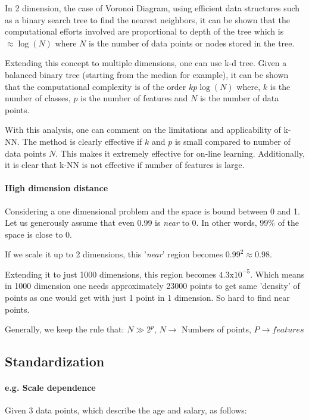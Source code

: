 \documentclass{article}
\begin{document}
{{{            In 2 dimension, the case of Voronoi Diagram, using efficient data structures such as a binary search tree to find the nearest neighbors, it can be shown that the computational efforts involved are proportional to depth of the tree which is \(\approx \log(N)\) where $N$ is the number of data points or nodes stored in the tree. 

            Extending this concept to multiple dimensions, one can use k-d tree. Given a balanced binary tree (starting from the median for example), it can be shown that the computational complexity is of the order $kp\log(N)$ where, $k$ is the number of classes, $p$ is the number of features and $N$ is the number of data points. 

            With this analysis, one can comment on the limitations and applicability of k-NN. The method is clearly effective if $k$ and $p$ is small compared to number of data points $N$. This makes it extremely effective for on-line learning. Additionally, it is clear that k-NN is not effective if number of features is large. 
        }

        \paragraph{High dimension distance}{
            Considering a one dimensional problem and the space is bound between 0 and 1. Let us generously assume that even 0.99 is \textit{near} to 0. In other words, 99\% of the space is close to 0. 

            If we scale it up to 2 dimensions, this '\textit{near}' region becomes \(\mathrm{0.99^2} \approx \mathrm{0.98}\). 

            Extending it to just 1000 dimensions, this region becomes \(\mathrm{4.3 x 10^{-5}}\). Which means in 1000 dimension one needs approximately 23000 points to get same 'density' of points as one would get with just 1 point in 1 dimension. So hard to find near points.

            Generally, we keep the rule that: \(N\gg 2^p\), \(N \rightarrow \) Numbers of points, \(P \rightarrow features\)
        }
    }
    \subsection{Standardization}{
        \paragraph{e.g. Scale dependence}{
            Given 3 data points, which describe the age and salary, as follows:

}}}
\end{document}
